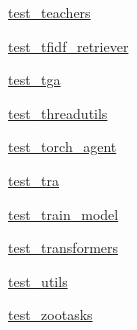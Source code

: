 \begin{DoxyCompactItemize}
\item 
 \hyperlink{namespacetests_1_1test__teachers}{test\+\_\+teachers}
\item 
 \hyperlink{namespacetests_1_1test__tfidf__retriever}{test\+\_\+tfidf\+\_\+retriever}
\item 
 \hyperlink{namespacetests_1_1test__tga}{test\+\_\+tga}
\item 
 \hyperlink{namespacetests_1_1test__threadutils}{test\+\_\+threadutils}
\item 
 \hyperlink{namespacetests_1_1test__torch__agent}{test\+\_\+torch\+\_\+agent}
\item 
 \hyperlink{namespacetests_1_1test__tra}{test\+\_\+tra}
\item 
 \hyperlink{namespacetests_1_1test__train__model}{test\+\_\+train\+\_\+model}
\item 
 \hyperlink{namespacetests_1_1test__transformers}{test\+\_\+transformers}
\item 
 \hyperlink{namespacetests_1_1test__utils}{test\+\_\+utils}
\item 
 \hyperlink{namespacetests_1_1test__zootasks}{test\+\_\+zootasks}
\end{DoxyCompactItemize}
